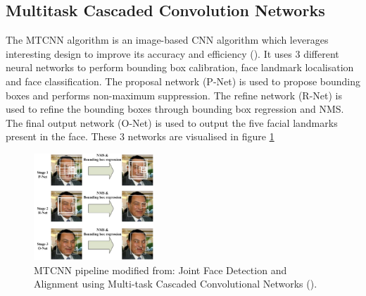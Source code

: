 \documentclass{l4proj}
\begin{document}
\subsection{Multitask Cascaded Convolution Networks}
\label{mtcnn}
The MTCNN algorithm is an image-based CNN algorithm which leverages interesting design to improve its accuracy and efficiency (\cite{mtcnn}). It uses 3 different neural networks to perform bounding box calibration, face landmark localisation and face classification. The proposal network (P-Net) is used to propose bounding boxes and performs non-maximum suppression. The refine network (R-Net) is used to refine the bounding boxes through bounding box regression and NMS. The final output network (O-Net) is used to output the five facial landmarks present in the face. These 3 networks are visualised in figure \ref{mtcnn_pipeline}
\begin{figure}[h!]
  \centering
  \begin{minipage}{\textwidth}
  \centering
    \includegraphics[width=0.4\textwidth]{images/Inkedcropped_mtcnn_pipeline.jpg}
    \centering
    \caption{MTCNN pipeline modified from: Joint Face Detection and Alignment using Multi-task Cascaded Convolutional Networks (\cite{mtcnn}).}
    \label{mtcnn_pipeline}
  \end{minipage}
  \hfill
\end{figure}
\end{document}
